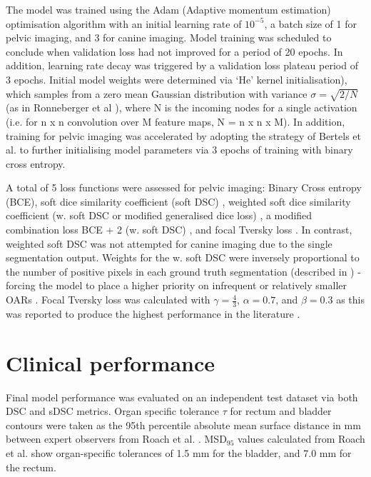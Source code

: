 The model was trained using the Adam (Adaptive momentum estimation) optimisation algorithm \cite{kingma2014} with an initial learning rate of $10^{-5}$, a batch size of 1 for pelvic imaging, and 3 for canine imaging. Model training was scheduled to conclude when validation loss had not improved for a period of 20 epochs. In addition, learning rate decay was triggered by a validation loss plateau period of 3 epochs. Initial model weights were determined via `He' kernel initialisation), which samples from a zero mean Gaussian distribution with variance $\sigma=\sqrt{2/N}$ (as in Ronneberger et al \cite{Ronneberger_2015}), where N is the incoming nodes for a single activation (i.e. for n x n convolution over M feature maps, N = n x n x M). In addition, training for pelvic imaging was accelerated by adopting the strategy of Bertels et al. to further initialising model parameters via 3 epochs of training with binary cross entropy.

A total of 5 loss functions were assessed for pelvic imaging: Binary Cross entropy (BCE), soft dice similarity coefficient (soft DSC) \cite{Bertels2019}, weighted soft dice similarity coefficient (w. soft DSC or modified generalised dice loss) \cite{Sudre_2017}, a modified combination loss BCE + 2 (w. soft DSC) \cite{taghanaki2018}, and focal Tversky loss \cite{Zhu_2018, Khan2019, abraham2018}. In contrast, weighted soft DSC was not attempted for canine imaging due to the single segmentation output. Weights for the w. soft DSC were inversely proportional to the number of positive pixels in each ground truth segmentation (described in \cite{Sudre_2017}) - forcing the model to place a higher priority on infrequent or relatively smaller OARs \cite{Sudre_2017}. Focal Tversky loss was calculated with $\gamma = \frac{4}{3}$, $\alpha=0.7$, and $\beta=0.3$ as this was reported to produce the highest performance in the literature \cite{Khan2019}.

\section{Clinical performance}

Final model performance was evaluated on an independent test dataset via both DSC and sDSC metrics. Organ specific tolerance $\tau$ for rectum and bladder contours were taken as the 95th percentile absolute mean surface distance in mm between expert observers from Roach et al. \cite{Roach_2019}. MSD$_{95}$ values calculated from Roach et al. show organ-specific tolerances of 1.5 mm for the bladder, and 7.0 mm
for the rectum.


